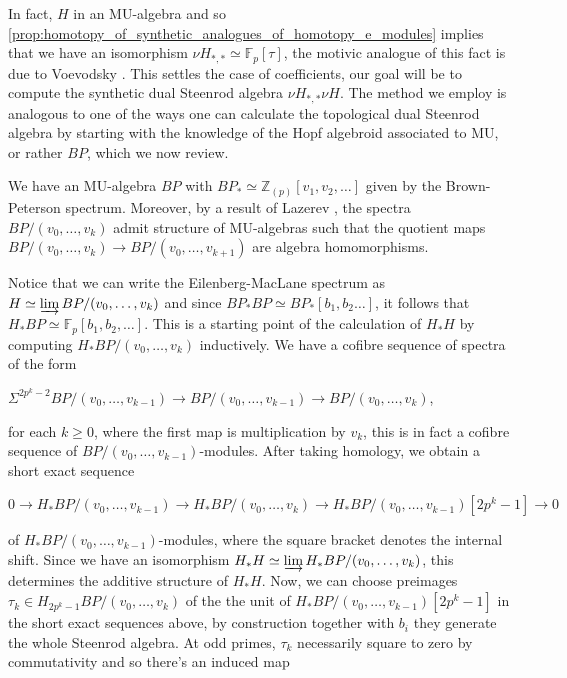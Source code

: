 \documentclass[oneside,a4paper]{amsart}
\newcommand{\MU}{\mathrm{MU}} %
\theoremstyle{plain}
\theoremstyle{definition}
\theoremstyle{remark}
\begin{document}
In fact, $H$ in an $\MU$-algebra and so \cref{prop:homotopy_of_synthetic_analogues_of_homotopy_e_modules} implies that we have an isomorphism $\nu H_{*, *} \simeq \mathbb{F}_{p}[\tau]$, the motivic analogue of this fact is due to Voevodsky \cite{voevodsky2003motivic}. This settles the case of coefficients, our goal will be to compute the synthetic dual Steenrod algebra $\nu H _{*, *} \nu H$. The method we employ is analogous to one of the ways one can calculate the topological dual Steenrod algebra by starting with the knowledge of the Hopf algebroid associated to $\MU$, or rather $BP$, which we now review.

We have an $\MU$-algebra $BP$ with $BP_{*} \simeq \mathbb{Z}_{(p)}[v_{1}, v_{2}, \ldots]$ given by the Brown-Peterson spectrum. Moreover, by a result of Lazerev \cite{lazarev2003towers}, the spectra $BP/(v_{0}, \ldots, v_{k})$ admit structure of $\MU$-algebras such that the quotient maps $BP/(v_{0}, \ldots, v_{k}) \rightarrow BP/(v_{0}, \ldots, v_{k+1})$ are algebra homomorphisms.

Notice that we can write the Eilenberg-MacLane spectrum as $H \simeq \varinjlim BP/(v_{0}, \ldots, v_{k})$ and since $BP_{*}BP \simeq BP_{*}[b_{1}, b_{2} \ldots]$, it follows that $H_{*}BP \simeq \mathbb{F}_{p}[b_{1}, b_{2}, \ldots]$. This is a starting point of the calculation of $H_{*}H$ by computing $H_{*} BP/(v_{0}, \ldots, v_{k})$ inductively. We have a cofibre sequence of spectra of the form

\begin{center}
$\Sigma^{2p^{k}-2}BP/(v_{0}, \ldots, v_{k-1}) \rightarrow BP/(v_{0}, \ldots, v_{k-1}) \rightarrow BP/(v_{0}, \ldots, v_{k})$,
\end{center}
for each $k \geq 0$, where the first map is multiplication by $v_{k}$, this is in fact a cofibre sequence of $BP/(v_{0}, \ldots, v_{k-1})$-modules. After taking homology, we obtain a short exact sequence

\begin{center}
$0 \rightarrow H_{*} BP/(v_{0}, \ldots, v_{k-1}) \rightarrow H_{*} BP/(v_{0}, \ldots, v_{k}) \rightarrow H_{*} BP/(v_{0}, \ldots, v_{k-1})[2p^{k}-1] \rightarrow 0$ 
\end{center}
of $H_{*}BP/(v_{0}, \ldots, v_{k-1})$-modules, where the square bracket denotes the internal shift. Since we have an isomorphism $H_{*} H \simeq \varinjlim H_{*} BP/ (v_{0}, \ldots, v_{k})$, this determines the additive structure of $H_{*}H$. Now, we can choose preimages $\tau_{k} \in H_{2p^{k}-1} BP /(v_{0}, \ldots, v_{k})$ of the the unit of $H_{*} BP/(v_{0}, \ldots, v_{k-1})[2p^{k}-1]$ in the short exact sequences above, by construction together with $b_{i}$ they generate the whole Steenrod algebra. At odd primes, $\tau_{k}$ necessarily square to zero by commutativity and so there's an induced map 
\end{document}
